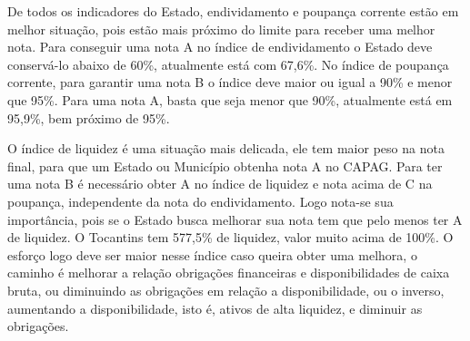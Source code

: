 De todos os indicadores do Estado, endividamento e poupança corrente
estão em melhor situação, pois estão mais próximo do limite para receber
uma melhor nota. Para conseguir uma nota A no índice de endividamento o
Estado deve conservá-lo abaixo de 60\%, atualmente está com 67,6\%. No
índice de poupança corrente, para garantir uma nota B o índice deve
maior ou igual a 90\% e menor que 95\%. Para uma nota A, basta que seja
menor que 90\%, atualmente está em 95,9\%, bem próximo de 95\%.

O índice de liquidez é uma situação mais delicada, ele tem maior peso na
nota final, para que um Estado ou Município obtenha nota A no CAPAG.
Para ter uma nota B é necessário obter A no índice de liquidez e nota
acima de C na poupança, independente da nota do endividamento. Logo
nota-se sua importância, pois se o Estado busca melhorar sua nota tem
que pelo menos ter A de liquidez. O Tocantins tem 577,5\% de liquidez,
valor muito acima de 100\%. O esforço logo deve ser maior nesse índice
caso queira obter uma melhora, o caminho é melhorar a relação obrigações
financeiras e disponibilidades de caixa bruta, ou diminuindo as
obrigações em relação a disponibilidade, ou o inverso, aumentando a
disponibilidade, isto é, ativos de alta liquidez, e diminuir as
obrigações.

